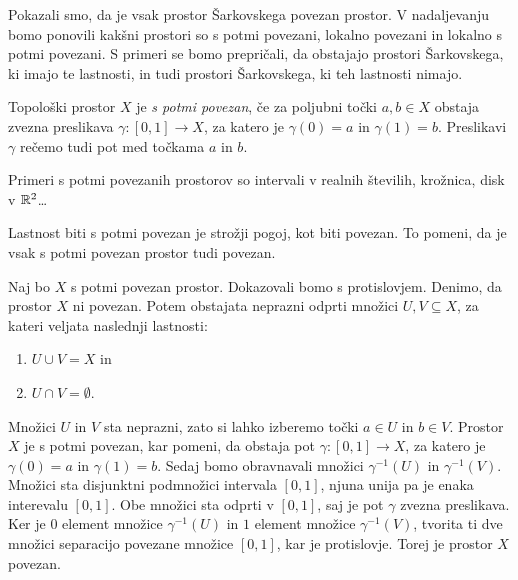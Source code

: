 \documentclass[../TG_magistrsko_delo_sections.tex]{subfiles}
\begin{document}
Pokazali smo, da je vsak prostor Šarkovskega povezan prostor. V nadaljevanju bomo ponovili kakšni prostori so s potmi povezani, lokalno povezani in lokalno s potmi povezani. S primeri se bomo prepričali, da obstajajo prostori Šarkovskega, ki imajo te lastnosti, in tudi prostori Šarkovskega, ki teh lastnosti nimajo.


\begin{definicija}
Topološki prostor $X$ je \emph{s potmi povezan}, če za poljubni točki $a, b \in X$ obstaja zvezna preslikava $\gamma:[0, 1] \to X$, za katero je $\gamma(0) = a$ in $\gamma(1) = b$. Preslikavi $\gamma$ rečemo tudi pot med točkama $a$ in $b$.
\end{definicija}

Primeri s potmi povezanih prostorov so intervali v realnih številih, krožnica, disk v $\mathbb R^2$\dots
\begin{trditev}
Lastnost biti s potmi povezan je strožji pogoj, kot biti povezan. To pomeni, da je vsak s potmi povezan prostor tudi povezan.
\end{trditev}

\begin{dokaz}
Naj bo $X$ s potmi povezan prostor. Dokazovali bomo s protislovjem. Denimo, da prostor $X$ ni povezan. Potem obstajata neprazni odprti množici $U, V \subseteq X$, za kateri veljata naslednji lastnosti:
\begin{enumerate}
\item $U \cup V = X$ in 
\item $U \cap V = \emptyset$.
\end{enumerate}
Množici $U$ in $V$ sta neprazni, zato si lahko izberemo točki $a\in U$ in $b\in V$. Prostor $X$ je s potmi povezan, kar pomeni, da obstaja pot $\gamma : [0, 1] \to X$, za katero je $\gamma(0) =a$ in $\gamma(1)=b$. Sedaj bomo obravnavali množici $\gamma^{-1}(U)$ in $\gamma^{-1}(V)$. Množici sta disjunktni podmnožici intervala $[0, 1]$, njuna unija pa je enaka interevalu $[0, 1]$. Obe množici sta odprti v $[0, 1]$, saj je pot $\gamma$ zvezna preslikava. Ker je $0$ element množice  $\gamma^{-1}(U)$ in $1$ element množice $\gamma^{-1}(V)$, tvorita ti dve množici separacijo povezane množice $[0, 1]$, kar je protislovje. Torej je prostor $X$ povezan.
\end{dokaz}
\end{document}
